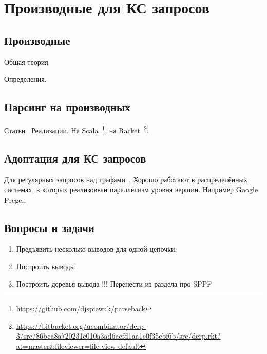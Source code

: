\section{Производные для КС запросов}

\subsection{Производные}

Общая теория.

Определения.

\subsection{Парсинг на производных}

Статьи~\cite{DBLP:journals/corr/abs-1010-5023,Adams:2016:CPP:2908080.2908128,Might:2011:PDF:2034574.2034801,andersenparsing}
Реализации.
На Scala~\footnote{\url{https://github.com/djspiewak/parseback}}, на Racket~\footnote{\url{https://bitbucket.org/ucombinator/derp-3/src/86bca8a720231e010a3ad6aefd1aa1c0f35cbf6b/src/derp.rkt?at=master&fileviewer=file-view-default}}.

\subsection{Адоптация для КС запросов}

Для регулярных запросов над графами~\cite{Nole:2016:RPQ:2949689.2949711}.
Хорошо работают в распределённых системах, в которых реализовван параллелизм уровня вершин. 
Например Google Pregel.



\subsection{Вопросы и задачи}
\begin{enumerate}
  \item Предъявить несколько выводов для одной цепочки.
  \item Построить выводы
  \item Построить деревья вывода !!! Перенести из раздела про SPPF
\end{enumerate}

